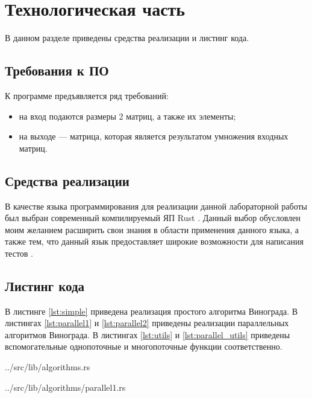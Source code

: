 \chapter{Технологическая часть}

В данном разделе приведены средства реализации и листинг кода.

\section{Требования к ПО}

К программе предъявляется ряд требований:
\begin{itemize}
	\item на вход подаются размеры 2 матриц, а также их элементы;
	\item на выходе — матрица, которая является результатом умножения входных матриц.
\end{itemize}

\section{Средства реализации}

В качестве языка программирования для реализации данной лабораторной работы был выбран современный компилируемый ЯП Rust \cite{rustlang}. Данный выбор обусловлен моим желанием расширить свои знания в области применения данного языка, а также тем, что данный язык предоставляет широкие возможности для написания тестов \cite{rusttest}.

\section{Листинг кода}

В листинге \ref{lst:simple} приведена реализация простого алгоритма Винограда. В листингах \ref{lst:parallel1} и \ref{lst:parallel2} приведены реализации параллельных алгоритмов Винограда. В листингах \ref{lst:utils} и \ref{lst:parallel_utils} приведены вспомогательные однопоточные и многопоточные функции соответственно.

\begin{lstinputlisting}[
	caption={Последовательный алгоритм Винограда},
	label={lst:simple},
	style={rust},
	linerange={24-83}
]{../src/lib/algorithms.rs}
\end{lstinputlisting}

\begin{lstinputlisting}[
	caption={Параллельный алгоритм Винограда 1},
	label={lst:parallel1},
	style={rust},
	linerange={3-14}
]{../src/lib/algorithms/parallel1.rs}
\end{lstinputlisting}

